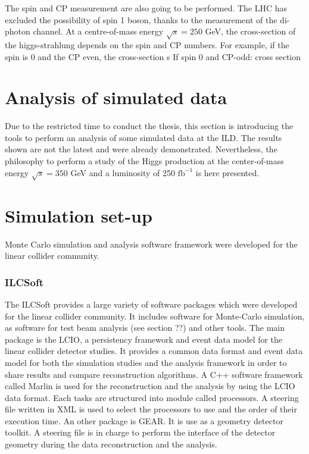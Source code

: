    The spin and CP measurement are also going to be performed. 
    The LHC has excluded the possibility of spin 1 boson, thanks to the measurement of the di-photon channel. 
    At a centre-of-mass energy $\sqrt{s} = 250$ GeV, the cross-section of the higgs-strahlung depends on the spin and CP numbers.
    For example, if the spin is 0 and the CP even, the cross-section s
    If spin 0 and CP-odd: cross section
    


  \section{Analysis of simulated data}
  
    Due to the restricted time to conduct the thesis, this section is introducing the tools to perform an analysis of some simulated data at the ILD. 
    The results shown are not the latest and were already demonstrated. 
    Nevertheless, the philosophy to perform a study of the Higgs production at the center-of-mass energy $\sqrt{s} = 350$ GeV and a luminosity of 250 $\text{fb}^{-1}$ is here presented.
  
  \section{Simulation set-up}  
  
    Monte Carlo simulation and analysis software framework were developed for the linear collider community.

    \subsubsection{ILCSoft}
    
    The ILCSoft provides a large variety of software packages which were developed for the linear collider community\cite{ilcsoft}.
    It includes software for Monte-Carlo simulation, as software for test beam analysis (see section ??) and other tools.
    The main package is the \gls{LCIO}, a persistency framework and event data model for the linear collider detector studies\cite{lcio}. 
    It provides a common data format and event data model for both the simulation studies and the analysis framework in order to share results and compare reconstruction algorithms.
    A C++ software framework called \gls{Marlin} is used for the reconstruction and the analysis by using the \gls{LCIO} data format.
    Each tasks are structured into module called processors. 
    A steering file written in XML is used to select the processors to use and the order of their execution time.
    An other package is \gls{GEAR}.
    It is use as a geometry detector toolkit.
    A steering file is in charge to perform the interface of the detector geometry during the data reconstruction and the analysis.

